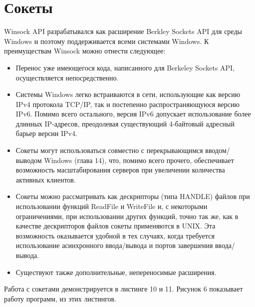 \documentclass[a4paper,12pt]{article} %
\begin{document}
\newpage
\section*{Сокеты}

Winsock API разрабатывался как расширение Berkley Sockets API для среды Windows и поэтому поддерживается всеми системами Windows. К преимуществам Winsock можно отнести следующее:

\begin{itemize}
\item Перенос уже имеющегося кода, написанного для Berkeley Sockets API, осуществляется непосредственно.

\item Системы Windows легко встраиваются в сети, использующие как версию IPv4 протокола TCP/IP, так и постепенно распространяющуюся версию IPv6. Помимо всего остального, версия IPv6 допускает использование более длинных IP-адресов, преодолевая существующий 4-байтовый адресный барьер версии IPv4.

\item Сокеты могут использоваться совместно с перекрывающимся вводом/выводом Windows (глава 14), что, помимо всего прочего, обеспечивает возможность масштабирования серверов при увеличении количества активных клиентов.

\item Сокеты можно рассматривать как дескрипторы (типа HANDLE) файлов при использовании функций ReadFile и WriteFile и, с некоторыми ограничениями, при использовании других функций, точно так же, как в качестве дескрипторов файлов сокеты применяются в UNIX. Эта возможность оказывается удобной в тех случаях, когда требуется использование асинхронного ввода/вывода и портов завершения ввода/вывода.

\item Существуют также дополнительные, непереносимые расширения.
\end{itemize}

Работа с сокетами демонстрируется в листинге 10 и 11. Рисунок 6 показывает работу программ, из этих листингов.
\end{document}
